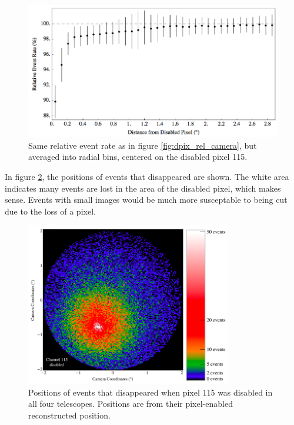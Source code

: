 \begin{figure}[h]\label{fig:dpix_rel_radial}
  \begin{center}
    \includegraphics[width=\textwidth]{images/disabled_pixel/relativerate_radial}
    \caption[Radial Relative Event Rate]{Same relative event rate as in figure \ref{fig:dpix_rel_camera}, but averaged into radial bins, centered on the disabled pixel 115. }
  \end{center}
\end{figure}

In figure \ref{fig:dpix_disappear}, the positions of events that disappeared are shown.
The white area indicates many events are lost in the area of the disabled pixel, which makes sense.
Events with small images would be much more susceptable to being cut due to the loss of a pixel.

\begin{figure}[h]\label{fig:dpix_disappear}
  \begin{center}
    \includegraphics[width=0.8\textwidth]{images/disabled_pixel/disappearing_events}
    \caption[Disappering Events]{Positions of events that disappeared when pixel 115 was disabled in all four telescopes.  Positions are from their pixel-enabled reconstructed position.}
  \end{center}
\end{figure}

